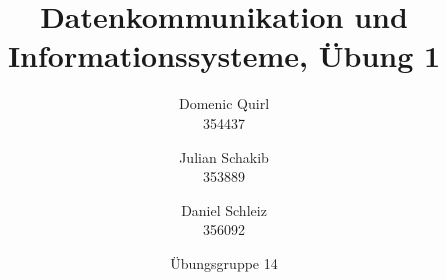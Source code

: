 \documentclass{../exercisesheet}
\title{Datenkommunikation und Informationssysteme, Übung 1}
\author{
    Domenic Quirl \\ 354437
    \and
    Julian Schakib \\ 353889
    \and 
    Daniel Schleiz \\ 356092
}
\date{Übungsgruppe 14}
\begin{document}
\maketitle
\pointtable

\begin{exercise}{1}
\end{exercise}

\begin{exercise}{3}
	\begin{subexercise}
		
	\end{subexercise}

	\begin{subexercise}
		  
	\end{subexercise}
\end{exercise}


\begin{exercise}{5}
	\begin{subexercise}
	
	\end{subexercise}

	\begin{subexercise}
	
	\end{subexercise}

	\begin{subexercise} 
	
	\end{subexercise}
\end{exercise}
\end{document}
